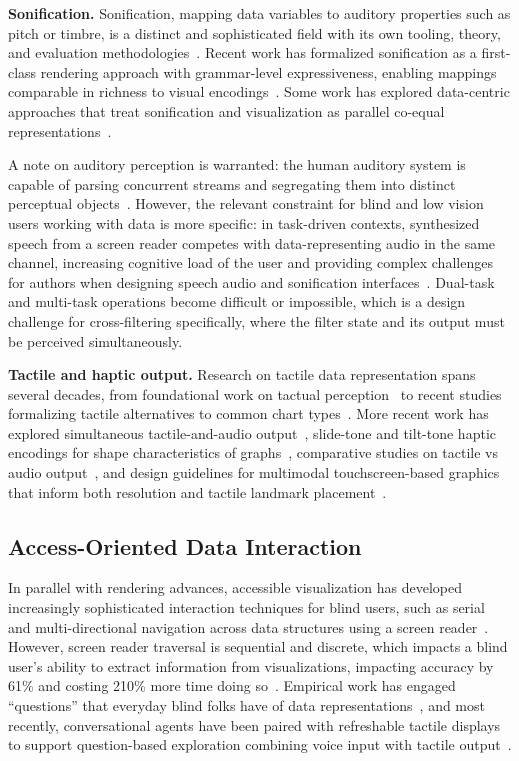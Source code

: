 \documentclass[12pt]{cmuthesis}
\begin{document}
\textbf{Sonification.} Sonification, mapping data variables to auditory properties such as pitch or timbre, is a distinct and sophisticated field with its own tooling, theory, and evaluation methodologies~\cite{Hermann2011}. Recent work has formalized sonification as a first-class rendering approach with grammar-level expressiveness, enabling mappings comparable in richness to visual encodings~\cite{Kim2024}. Some work has explored data-centric approaches that treat sonification and visualization as parallel co-equal representations~\cite{Zong2024}.

A note on auditory perception is warranted: the human auditory system is capable of parsing concurrent streams and segregating them into distinct perceptual objects~\cite{bregman1990auditory}. However, the relevant constraint for blind and low vision users working with data is more specific: in task-driven contexts, synthesized speech from a screen reader competes with data-representing audio in the same channel, increasing cognitive load of the user and providing complex challenges for authors when designing speech audio and sonification interfaces~\cite{Gherri2011, Kim2024, Thompson2023Chart}. Dual-task and multi-task operations become difficult or impossible, which is a design challenge for cross-filtering specifically, where the filter state and its output must be perceived simultaneously.

\textbf{Tactile and haptic output.} Research on tactile data representation spans several decades, from foundational work on tactual perception~\cite{Schiff1983} to recent studies formalizing tactile alternatives to common chart types~\cite{Engel2017, Race2023}. More recent work has explored simultaneous tactile-and-audio output~\cite{Butler2021Technology}, slide-tone and tilt-tone haptic encodings for shape characteristics of graphs~\cite{Fan2022}, comparative studies on tactile vs audio output~\cite{Chundury2026}, and design guidelines for multimodal touchscreen-based graphics that inform both resolution and tactile landmark placement~\cite{Gorlewicz2020}.

\subsection{Access-Oriented Data Interaction} 

In parallel with rendering advances, accessible visualization has developed increasingly sophisticated interaction techniques for blind users, such as serial and multi-directional navigation across data structures using a screen reader~\cite{Zong2022Rich, Elavsky2023}. However, screen reader traversal is sequential and discrete, which impacts a blind user's ability to extract information from visualizations, impacting accuracy by 61\% and costing 210\% more time doing so~\cite{Sharif2021}. Empirical work has engaged ``questions'' that everyday blind folks have of data representations~\cite{Kim2023Exploring}, and most recently, conversational agents have been paired with refreshable tactile displays to support question-based exploration combining voice input with tactile output~\cite{Reinders2025}.
\end{document}
